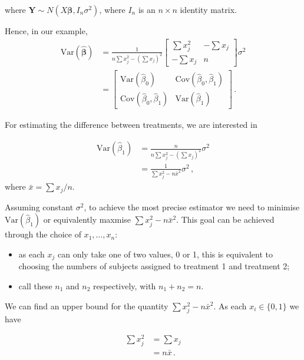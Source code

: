 \documentclass[
]{book}
\providecommand{\tightlist}{%
  \setlength{\itemsep}{0pt}\setlength{\parskip}{0pt}}
\theoremstyle{definition}
\theoremstyle{definition}
\theoremstyle{definition}
\theoremstyle{definition}
\theoremstyle{remark}
\begin{document}
where \(\boldsymbol{Y}\sim N(X\boldsymbol{\beta},I_n\sigma^{2})\), where \(I_n\) is an \(n\times n\) identity matrix.

Hence, in our example,
\begin{align*}
\textrm{Var}(\hat{\boldsymbol{\beta}}) & = \frac{1}{n\sum x_j^{2}-(\sum x_j)^{2}}\left[\begin{array}{cc}
\sum x_j^{2}&-\sum x_j\\
-\sum x_j&n\end{array}\right]\sigma^{2}\\
& = \left[\begin{array}{cc}
\textrm{Var}(\hat\beta_{0})&\textrm{Cov}(\hat\beta_{0},\hat\beta_{1})\\
\textrm{Cov}(\hat\beta_{0},\hat\beta_{1})&\textrm{Var}(\hat\beta_{1})\end{array}\right]\,.
\end{align*}

For estimating the difference between treatments, we are interested in

\begin{align*}
\textrm{Var}(\hat{\beta}_{1})& = \frac{n}{n\sum x_j^{2}-(\sum x_j)^{2}}\sigma^{2}\\
 & = \frac{1}{\sum x_j^{2} - n\bar{x}^2}\sigma^{2}\,,
\end{align*}
where \(\bar{x} = \sum x_j / n\).

Assuming constant \(\sigma^2\), to achieve the most precise estimator we need to minimise \(\textrm{Var}(\hat{\beta}_{1})\) or equivalently maxmise \(\sum x_j^{2} - n\bar{x}^2\). This goal can be achieved through the choice of \(x_{1},\dots,x_{n}\):

\begin{itemize}
\tightlist
\item
  as each \(x_j\) can only take one of two values, 0 or 1, this is equivalent to choosing the numbers of subjects assigned to treatment 1 and treatment 2;
\item
  call these \(n_{1}\) and \(n_{2}\) respectively, with \(n_{1}+n_{2}=n\).
\end{itemize}

We can find an upper bound for the quantity \(\sum x_j^{2} - n\bar{x}^2\). As each \(x_i\in\{0,1\}\) we have

\begin{align}
\sum x_j^2 & = \sum x_j \\
& = n\bar{x}\,.
\end{align}
\end{document}
